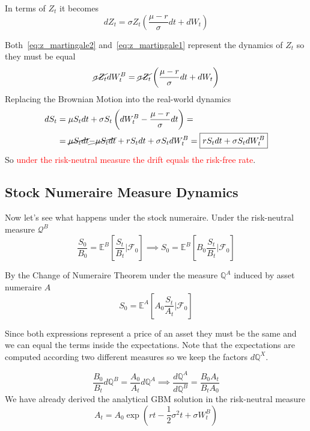 \documentclass[12pt,a4paper]{article}
\begin{document}
In terms of $Z_t$ it becomes
\begin{equation}
dZ_t = \sigma Z_t\left(\frac{\mu - r}{\sigma}dt + dW_t \right)
\label{eq:z_martingale2}
\end{equation}

Both~\ref{eq:z_martingale2} and~\ref{eq:z_martingale1} represent the dynamics of $Z_t$ so they must be equal
\begin{equation*}
\cancel{\sigma Z_t}dW_t^B = \cancel{\sigma Z_t}\left(\frac{\mu - r}{\sigma}dt + dW_t\right)
\end{equation*}
Replacing the Brownian Motion into the real-world dynamics
\begin{equation*}
\begin{aligned}
dS_t &= \mu S_t dt + \sigma S_t \left(dW_t^B - \frac{\mu - r}{\sigma}dt\right) =\\
& = \cancel{\mu S_t dt} \cancel{-\mu S_t dt} + rS_t dt + \sigma S_t dW_t^B  = \boxed{rS_t dt + \sigma S_t dW_t^B}
\end{aligned}
\end{equation*}
So \textcolor{red}{under the risk-neutral measure the drift equals the risk-free rate}.

\subsection{Stock Numeraire Measure Dynamics}
Now let's see what happens under the stock numeraire.
Under the risk-neutral measure $\mathcal{Q}^B$
\begin{equation*}
\frac{S_0}{B_0} = \mathbb{E}^{B}\left[\frac{S_t}{B_t}\bigg|\mathcal{F}_0\right] \implies
S_0 = \mathbb{E}^{B}\left[B_0\frac{S_t}{B_t}\bigg|\mathcal{F}_0\right]
\end{equation*}

By the Change of Numeraire Theorem under the measure $\mathbb{Q}^A$ induced by asset numeraire $A$
\begin{equation*}
S_0 = \mathbb{E}^{A}\left[A_0\frac{S_t}{A_t}\bigg|\mathcal{F}_0\right]
\end{equation*}

Since both expressions represent a price of an asset they must be the same and we can equal the terms inside the expectations. Note that the expectations are computed according two different measures so we keep the factors $d\mathbb{Q}^X$. 

\begin{equation*}
\frac{B_0}{B_t}d\mathbb{Q}^B = \frac{A_0}{A_t}d\mathbb{Q}^A\implies \frac{d\mathbb{Q}^A}{d\mathbb{Q}^B}=\frac{B_0A_t}{B_tA_0}
\end{equation*}
We have already derived the analytical GBM solution in the risk-neutral measure
\begin{equation*} 
A_t = A_0 \exp\left(rt-\frac{1}{2}\sigma^2 t + \sigma W^B_t\right)
\end{equation*}
\end{document}
